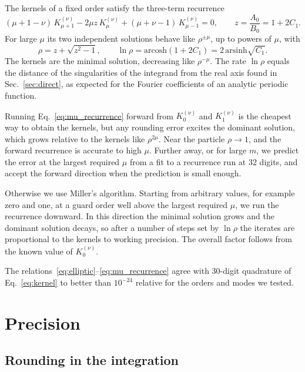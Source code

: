 \documentclass[11pt]{article}
\newcommand{\Kmn}[2]{K_{#1}^{(#2)}}
\begin{document}
The kernels of a fixed order satisfy the three-term recurrence
\begin{equation}
  \label{eq:mu_recurrence}
  (\mu+1-\nu)\,\Kmn{\mu+1}{\nu} - 2\mu z\,\Kmn{\mu}{\nu} + (\mu+\nu-1)\,\Kmn{\mu-1}{\nu} = 0,
  \qquad z=\frac{A_0}{B_0}=1+2C_1 .
\end{equation}
For large $\mu$ its two independent solutions behave like $\rho^{\pm\mu}$, up to
powers of $\mu$, with
\begin{equation}
  \label{eq:rho}
  \rho=z+\sqrt{z^2-1}, \qquad \ln\rho = \mathrm{arcosh}(1+2C_1) = 2\,\mathrm{arsinh}\sqrt{C_1}.
\end{equation}
The kernels are the minimal solution, decreasing like $\rho^{-\mu}$. The rate
$\ln\rho$ equals the distance of the singularities of the integrand from the
real axis found in Sec.~\ref{sec:direct}, as expected for the Fourier
coefficients of an analytic periodic function.

Running Eq.~\eqref{eq:mu_recurrence} forward from $\Kmn{0}{\nu}$ and
$\Kmn{1}{\nu}$ is the cheapest way to obtain the kernels, but any rounding
error excites the dominant solution, which grows relative to the kernels like
$\rho^{2\mu}$. Near the particle $\rho\to1$, and the forward recurrence is
accurate to high $\mu$. Further away, or for large $m$, we predict the error
at the largest required $\mu$ from a fit to a recurrence run at 32 digits, and
accept the forward direction when the prediction is small enough.

Otherwise we use Miller's algorithm. Starting from arbitrary values, for
example zero and one, at a guard order well above the largest required $\mu$,
we run the recurrence downward. In this direction the minimal solution grows
and the dominant solution decays, so after a number of steps set by
$\ln\rho$ the iterates are proportional to the kernels to working precision.
The overall factor follows from the known value of $\Kmn{0}{\nu}$.

The relations~\eqref{eq:elliptic}--\eqref{eq:mu_recurrence} agree with 30-digit
quadrature of Eq.~\eqref{eq:kernel} to better than $10^{-24}$ relative for the
orders and modes we tested.

\section{Precision}
\label{sec:precision}

\subsection{Rounding in the integration}
\end{document}
